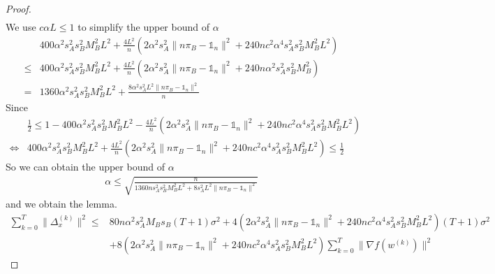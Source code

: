 \documentclass{article}
\newcommand{\norm}[1]{\| #1 \|}
\newcommand{\one}{\mathds{1}_n}
\begin{document}
\begin{proof}
\begin{align*}
\end{align*}
We use $c\alpha L\leq 1$ to simplify the upper bound of $\alpha$
\begin{align*}
    &400\alpha^2s_A^2s_B^2M_B^2L^2+\frac{4L^2}{n}\left(2\alpha^2s_A^2\norm{n\pi_B-\one}^2+240nc^2\alpha^4s_A^2s_B^2M_B^2L^2\right)\\
    \leq &400\alpha^2s_A^2s_B^2M_B^2L^2+\frac{4L^2}{n}\left(2\alpha^2s_A^2\norm{n\pi_B-\one}^2+240n\alpha^2s_A^2s_B^2M_B^2\right)\\
    =&1360\alpha^2s_A^2s_B^2M_B^2L^2+\frac{8\alpha^2s_A^2L^2\norm{n\pi_B-\one}^2}{n}
\end{align*}
Since
\begin{align*}
    &\frac{1}{2}\leq 1-400\alpha^2s_A^2s_B^2M_B^2L^2-\frac{4L^2}{n}\left(2\alpha^2s_A^2\norm{n\pi_B-\one}^2+240nc^2\alpha^4s_A^2s_B^2M_B^2L^2\right)\\
    \iff & 400\alpha^2s_A^2s_B^2M_B^2L^2+\frac{4L^2}{n}\left(2\alpha^2s_A^2\norm{n\pi_B-\one}^2+240nc^2\alpha^4s_A^2s_B^2M_B^2L^2\right)\leq \frac{1}{2}
\end{align*}
So we can obtain the upper bound of $\alpha$
\begin{align*}
    \alpha \leq \sqrt{\frac{n}{1360ns_A^2s_B^2M_B^2L^2+8s_A^2L^2\norm{n\pi_B-\one}^2}}
\end{align*}
and we obtain the lemma.
\begin{align*}
    \sum_{k=0}^T\norm{\Delta_x^{(k)}}^2 
  \leq &80n\alpha^2s_A^2M_Bs_B(T+1)\sigma^2+4\left(2\alpha^2s_A^2\norm{n\pi_B-\one}^2+240nc^2\alpha^4s_A^2s_B^2M_B^2L^2\right)(T+1)\sigma^2\\&+8\left(2\alpha^2s_A^2\norm{n\pi_B-\one}^2+240nc^2\alpha^4s_A^2s_B^2M_B^2L^2\right) \sum_{k=0}^T\norm{\nabla f(w^{(k)})}^2
\end{align*}
\end{proof}
\end{document}
